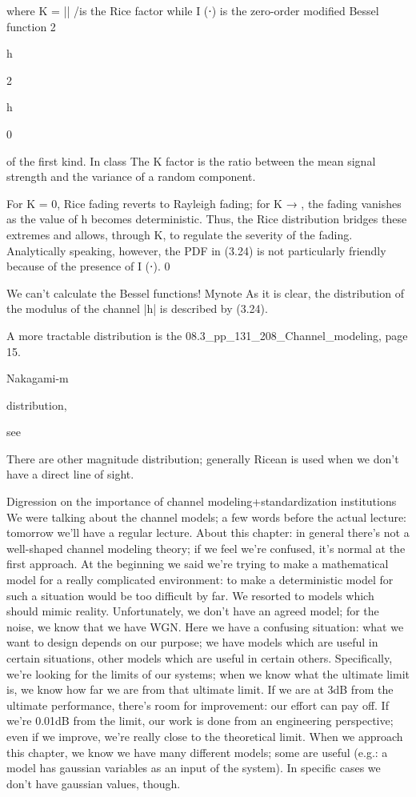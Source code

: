{{{{where K = |\mu | /\sigma is the Rice factor while I (⋅) is the zero-order modified Bessel function 2

h

2

h

0

of the first kind.
In class The K factor is the ratio between the mean signal strength and the variance of a random component.

For K = 0, Rice fading reverts to Rayleigh fading; for K → \infty, the fading vanishes as the value of h becomes deterministic. Thus, the Rice distribution bridges these extremes and allows, through K, to regulate the severity of the fading. Analytically speaking,
however, the PDF in (3.24) is not particularly friendly because of the presence of I (⋅).
0

We can't calculate the Bessel functions!
​Mynote As it is clear, the distribution of the modulus of the channel |h| is described by (3.24).

A more tractable distribution is the 08.3_pp_131_208_Channel_modeling, page 15.

Nakagami-m

distribution,

see

There are other magnitude distribution; generally Ricean is used when we don't have a direct line of sight.

Digression on the importance of channel modeling+standardization institutions We were talking about the channel models; a few words before the actual lecture:
tomorrow we'll have a regular lecture.
About this chapter: in general there's not a well-shaped channel modeling theory; if we feel we're confused, it's normal at the first approach. At the beginning we said we're trying to make a mathematical model for a really complicated environment: to make a deterministic model for such a situation would be too difficult by far.
We resorted to models which should mimic reality. Unfortunately, we don't have an agreed model; for the noise, we know that we have WGN. Here we have a confusing situation: what we want to design depends on our purpose; we have models which are useful in certain situations, other models which are useful in certain others.
Specifically, we're looking for the limits of our systems; when we know what the ultimate limit is, we know how far we are from that ultimate limit.
If we are at 3dB from the ultimate performance, there's room for improvement: our effort can pay off. If we're 0.01dB from the limit, our work is done from an engineering perspective; even if we improve, we're really close to the theoretical limit.
When we approach this chapter, we know we have many different models; some are useful (e.g.: a model has gaussian variables as an input of the system). In specific cases we don't have gaussian values, though.

}}}}
